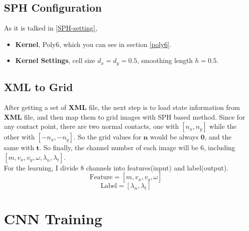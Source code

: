 \subsection{SPH Configuration}
As it is talked in \ref{SPH-setting}, 
\begin{itemize}
    \item \textbf{Kernel}, Poly6, which you can see in section \ref{poly6}.
    \item \textbf{Kernel Settings}, cell size $d_x=d_y=0.5$, smoothing length $h=0.5$.
\end{itemize}
\subsection{XML to Grid}
After getting a set of \textbf{XML} file, the next step is to load state information from \textbf{XML} file, and then map them to grid images with SPH based method. Since for any contact point, there are two normal contacts, one with $[n_x, n_y]$ while the other with $[-n_x, -n_y]$. So the grid values for $\pmb{n}$ would be always $\pmb{0}$, and the same  with $\pmb{t}$. So finally, the channel number of each image will be $6$, including $[m, v_x, v_y, \omega, \lambda_n, \lambda_t]$. \\

For the learning, I divide 8 channels into features(input) and label(output).
    $$\text{Feature} = [m, v_x, v_y, \omega]$$
    $$\text{Label} = [\lambda_n, \lambda_t]$$


\section{CNN Training}
